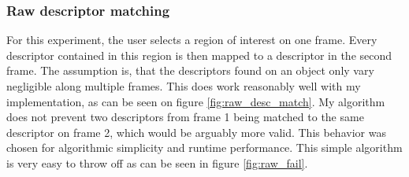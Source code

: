 \documentclass{paper}
\begin{document}
\subsubsection{Raw descriptor matching}
\label{sec:raw}
For this experiment, the user selects a region of interest on one frame. Every 
descriptor contained in this region is then mapped to a descriptor in the second frame.
The assumption is, that the descriptors found on an object only vary negligible along
multiple frames. This does work reasonably well with my implementation, as can be seen
on figure \ref{fig:raw_desc_match}. My algorithm does not prevent two descriptors from
frame 1 being matched to the same descriptor on frame 2, which would be arguably more
valid. This behavior was chosen for algorithmic simplicity and runtime performance. 
This simple algorithm is very easy to throw off as can be seen in figure \ref{fig:raw_fail}.
\end{document}
